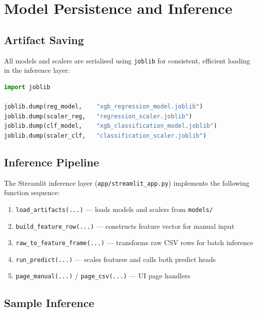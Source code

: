 \documentclass[12pt,a4paper]{article}
\begin{document}
\section{Model Persistence and Inference}

\subsection{Artifact Saving}

All models and scalers are serialised using \texttt{joblib} for consistent, efficient
loading in the inference layer:

\begin{lstlisting}[language=Python, caption={Artifact Serialisation}]
import joblib

joblib.dump(reg_model,    "xgb_regression_model.joblib")
joblib.dump(scaler_reg,   "regression_scaler.joblib")
joblib.dump(clf_model,    "xgb_classification_model.joblib")
joblib.dump(scaler_clf,   "classification_scaler.joblib")
\end{lstlisting}

\subsection{Inference Pipeline}

The Streamlit inference layer (\texttt{app/streamlit\_app.py}) implements the following
function sequence:

\begin{enumerate}
    \item \texttt{load\_artifacts(...)} --- loads models and scalers from \texttt{models/}
    \item \texttt{build\_feature\_row(...)} --- constructs feature vector for manual input
    \item \texttt{raw\_to\_feature\_frame(...)} --- transforms raw CSV rows for batch inference
    \item \texttt{run\_predict(...)} --- scales features and calls both predict heads
    \item \texttt{page\_manual(...)} / \texttt{page\_csv(...)} --- UI page handlers
\end{enumerate}

\subsection{Sample Inference}
\end{document}

